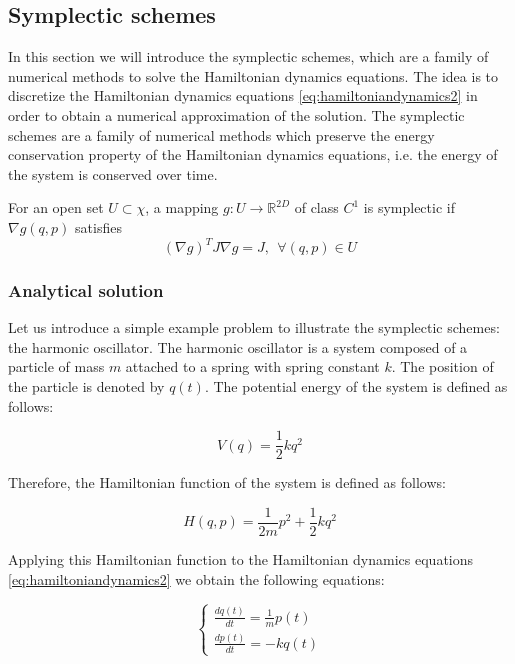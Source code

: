 \documentclass{article}
\begin{document}
\subsection{Symplectic schemes}
\label{sec:symplectic_schemes}

In this section we will introduce the symplectic schemes, which are a family of numerical methods to solve the Hamiltonian dynamics equations. The idea is to discretize the Hamiltonian dynamics equations \eqref{eq:hamiltoniandynamics2} in order to obtain a numerical approximation of the solution. The symplectic schemes are a family of numerical methods which preserve the energy conservation property of the Hamiltonian dynamics equations, i.e. the energy of the system is conserved over time.

\begin{definition}
	For an open set \(U \subset \chi \), a mapping \(g: U \rightarrow \mathbb{R}^{2D}\) of class \(C^1\) is symplectic if \(\nabla g(q,p)\) satisfies
	\[
		(\nabla g)^T J \nabla g = J, \ \ \forall (q,p) \in U
	\]
\end{definition}

\subsubsection{Analytical solution}
\label{sec:analytical_solution}

Let us introduce a simple example problem to illustrate the symplectic schemes: the harmonic oscillator. The harmonic oscillator is a system composed of a particle of mass \(m\) attached to a spring with spring constant \(k\). The position of the particle is denoted by \(q(t)\). The potential energy of the system is defined as follows:

\begin{equation*}
	V(q) = \frac{1}{2} k q^2
\end{equation*}

Therefore, the Hamiltonian function of the system is defined as follows:

\begin{equation}
	H(q,p) = \frac{1}{2m} p^2 + \frac{1}{2} k q^2
	\label{eq:hamiltonianharmonicoscillator}
\end{equation}

Applying this Hamiltonian function to the Hamiltonian dynamics equations \eqref{eq:hamiltoniandynamics2} we obtain the following equations:

\begin{equation*}
	\begin{cases}
		\frac{dq(t)}{dt} = \frac{1}{m} p(t) \\
		\frac{dp(t)}{dt} = -k q(t)
	\end{cases}
\end{equation*}
\end{document}
